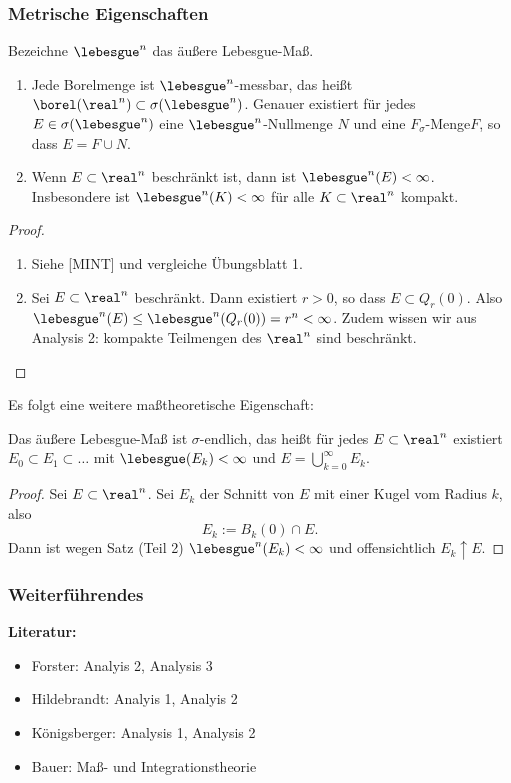 \subsubsection{Metrische Eigenschaften}
\begin{thm}
 Bezeichne $\lebesgue^n$ das äußere Lebesgue-Maß.
 \begin{enumerate}
  \item Jede Borelmenge ist $\lebesgue^n$-messbar, das heißt $\borel( \real^n ) \subset \sigma(\lebesgue^n)$. Genauer existiert für jedes $E \in \sigma(\lebesgue^n)$ eine $\lebesgue^n$-Nullmenge $N$ und eine $F_\sigma$-Menge\footnotemark $F$, so dass $E = F \cup N$.
  \item Wenn $E \subset \real^n$ beschränkt ist, dann ist $\lebesgue^n(E) < \infty$. Insbesondere ist $\lebesgue^n (K) < \infty$ für alle $K \subset \real^n$ kompakt.
 \end{enumerate}
\end{thm}

\begin{proof}
 \begin{enumerate}
  \item Siehe [MINT] und vergleiche Übungsblatt 1.
  \item Sei $E \subset \real^n$ beschränkt. Dann existiert $r > 0$, so dass $E \subset Q_r(0)$. Also $\lebesgue^n(E) \le \lebesgue^n( Q_r(0) ) = r^n < \infty$. Zudem wissen wir aus Analysis 2: kompakte Teilmengen des $\real^n$ sind beschränkt. \qedhere
 \end{enumerate}
\end{proof}

Es folgt eine weitere maßtheoretische Eigenschaft:
\begin{kor}
 Das äußere Lebesgue-Maß ist $\sigma$-endlich, das heißt für jedes $E \subset \real^n$ existiert $E_0 \subset E_1 \subset \ldots$ mit $\lebesgue(E_k) < \infty$ und $E = \bigcup_{k=0}^\infty E_k$.
\end{kor}

\begin{proof}
 Sei $E \subset \real^n$. Sei $E_k$ der Schnitt von $E$ mit einer Kugel vom Radius $k$, also
 \[ E_k := B_k(0) \cap E. \]
 Dann ist wegen Satz (Teil 2) $\lebesgue^n(E_k) < \infty$ und offensichtlich $E_k \uparrow E$.
\end{proof}

\subsubsection*{Weiterführendes}
\textbf{Literatur:}
\begin{itemize}
 \item Forster: Analyis 2, Analysis 3
 \item Hildebrandt: Analyis 1, Analyis 2
 \item Königsberger: Analysis 1, Analysis 2
 \item Bauer: Maß- und Integrationstheorie
\end{itemize}

